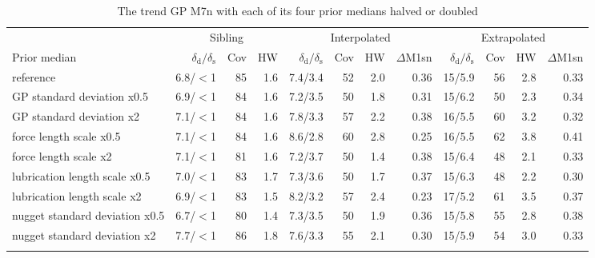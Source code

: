 \documentclass[pdflatex,sn-basic]{sn-jnl}
\newcommand{\tabsizesmall}{\footnotesize}
\begin{document}
\begin{table}[p]
\tabsizesmall
\setlength{\tabcolsep}{2.4pt}
\caption{The trend GP M7n with each of its four prior medians halved or doubled}\label{tab:s-priors}
\begin{tabular}{@{}lrrrrrrrrrrr@{}}
\toprule
 & \multicolumn{3}{c}{Sibling} & \multicolumn{4}{c}{Interpolated} & \multicolumn{4}{c}{Extrapolated} \\
\cmidrule(lr){2-4}\cmidrule(lr){5-8}\cmidrule(lr){9-12}
Prior median & $\delta_\mathrm{d}/\delta_\mathrm{s}$ & Cov & HW & $\delta_\mathrm{d}/\delta_\mathrm{s}$ & Cov & HW & $\Delta$M1sn & $\delta_\mathrm{d}/\delta_\mathrm{s}$ & Cov & HW & $\Delta$M1sn \\
\midrule
reference & 6.8/$<$1 & 85 & 1.6 & 7.4/3.4 & 52 & 2.0 & 0.36 & 15/5.9 & 56 & 2.8 & 0.33 \\
GP standard deviation x0.5 & 6.9/$<$1 & 84 & 1.6 & 7.2/3.5 & 50 & 1.8 & 0.31 & 15/6.2 & 50 & 2.3 & 0.34 \\
GP standard deviation x2 & 7.1/$<$1 & 84 & 1.6 & 7.8/3.3 & 57 & 2.2 & 0.38 & 16/5.5 & 60 & 3.2 & 0.32 \\
force length scale x0.5 & 7.1/$<$1 & 84 & 1.6 & 8.6/2.8 & 60 & 2.8 & 0.25 & 16/5.5 & 62 & 3.8 & 0.41 \\
force length scale x2 & 7.1/$<$1 & 81 & 1.6 & 7.2/3.7 & 50 & 1.4 & 0.38 & 15/6.4 & 48 & 2.1 & 0.33 \\
lubrication length scale x0.5 & 7.0/$<$1 & 83 & 1.7 & 7.3/3.6 & 50 & 1.7 & 0.37 & 15/6.3 & 48 & 2.2 & 0.30 \\
lubrication length scale x2 & 6.9/$<$1 & 83 & 1.5 & 8.2/3.2 & 57 & 2.4 & 0.23 & 17/5.2 & 61 & 3.5 & 0.37 \\
nugget standard deviation x0.5 & 6.7/$<$1 & 80 & 1.4 & 7.3/3.5 & 50 & 1.9 & 0.36 & 15/5.8 & 55 & 2.8 & 0.38 \\
nugget standard deviation x2 & 7.7/$<$1 & 86 & 1.8 & 7.6/3.3 & 55 & 2.1 & 0.30 & 15/5.9 & 54 & 3.0 & 0.33 \\
\botrule
\end{tabular}
\end{table}
\end{document}

